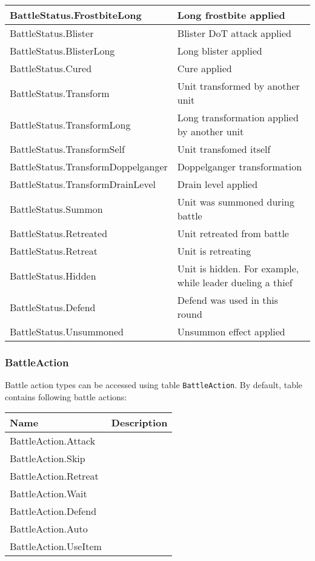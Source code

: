 \begin{tabularx}{\linewidth}{| l | X |}
\hline
BattleStatus.FrostbiteLong & Long frostbite applied\\
\hline
BattleStatus.Blister & Blister DoT attack applied\\
\hline
BattleStatus.BlisterLong & Long blister applied\\
\hline
BattleStatus.Cured & Cure applied\\
\hline
BattleStatus.Transform & Unit transformed by another unit\\
\hline
BattleStatus.TransformLong & Long transformation applied by another unit\\
\hline
BattleStatus.TransformSelf & Unit transfomed itself\\
\hline
BattleStatus.TransformDoppelganger & Doppelganger transformation\\
\hline
BattleStatus.TransformDrainLevel & Drain level applied\\
\hline
BattleStatus.Summon & Unit was summoned during battle\\
\hline
BattleStatus.Retreated & Unit retreated from battle\\
\hline
BattleStatus.Retreat & Unit is retreating\\
\hline
BattleStatus.Hidden & Unit is hidden. For example, while leader dueling a thief\\
\hline
BattleStatus.Defend & Defend was used in this round\\
\hline
BattleStatus.Unsummoned & Unsummon effect applied\\
\hline
\end{tabularx}

\subsubsection{BattleAction}
\label{BattleAction}
Battle action types can be accessed using table \texttt{BattleAction}.
By default, table contains following battle actions:\\
\begin{tabularx}{\linewidth}{| l | X |}
\hline
\textbf{Name} & \textbf{Description} \\
\hline
BattleAction.Attack &\\
\hline
BattleAction.Skip &\\
\hline
BattleAction.Retreat &\\
\hline
BattleAction.Wait &\\
\hline
BattleAction.Defend &\\
\hline
BattleAction.Auto &\\
\hline
BattleAction.UseItem &\\
\hline
\end{tabularx}

